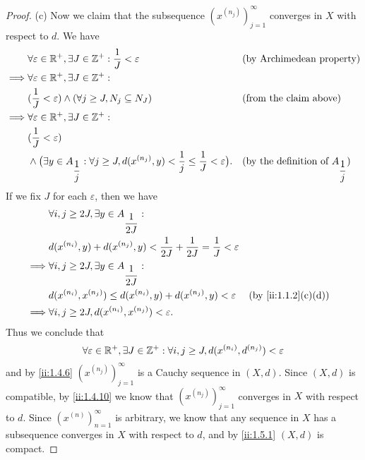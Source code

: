 \begin{proof}{(c)}
  Now we claim that the subsequence \((x^{(n_j)})_{j = 1}^\infty\) converges in \(X\) with respect to \(d\).
  We have
  \begin{align*}
             & \forall \varepsilon \in \mathbb{R}^+, \exists J \in \mathbb{Z}^+ : \dfrac{1}{J} < \varepsilon                                                      &  & \text{(by Archimedean property)}                   \\
    \implies & \forall \varepsilon \in \mathbb{R}^+, \exists J \in \mathbb{Z}^+ :                                                                                                                                         \\
             & (\dfrac{1}{J} < \varepsilon) \land (\forall j \geq J, N_j \subseteq N_J)                                                           &  & \text{(from the claim above)}                      \\
    \implies & \forall \varepsilon \in \mathbb{R}^+, \exists J \in \mathbb{Z}^+ :                                                                                                                                         \\
             & (\dfrac{1}{J} < \varepsilon)                                                                                                                                                               \\
             & \land \big(\exists y \in A_{\dfrac{1}{j}} : \forall j \geq J, d(x^{(n_j)}, y) < \dfrac{1}{j} \leq \dfrac{1}{J} < \varepsilon\big). &  & \text{(by the definition of \(A_{\dfrac{1}{j}}\))}
  \end{align*}
  If we fix \(J\) for each \(\varepsilon\), then we have
  \begin{align*}
             & \forall i, j \geq 2J, \exists y \in A_{\dfrac{1}{2J}} :                                                             \\
             & d(x^{(n_i)}, y) + d(x^{(n_j)}, y) < \dfrac{1}{2J} + \dfrac{1}{2J} = \dfrac{1}{J} < \varepsilon                      \\
    \implies & \forall i, j \geq 2J, \exists y \in A_{\dfrac{1}{2J}} :                                                             \\
             & d(x^{(n_i)}, x^{(n_j)}) \leq d(x^{(n_i)}, y) + d(x^{(n_j)}, y) < \varepsilon                   &  & \by{ii:1.1.2}[c,d] \\
    \implies & \forall i, j \geq 2J, d(x^{(n_i)}, x^{(n_j)}) < \varepsilon.
  \end{align*}
  Thus we conclude that
  \[
    \forall \varepsilon \in \mathbb{R}^+, \exists J \in \mathbb{Z}^+ : \forall i, j \geq J, d(x^{(n_i)}, d^{(n_j)}) < \varepsilon
  \]
  and by \cref{ii:1.4.6} \((x^{(n_j)})_{j = 1}^\infty\) is a Cauchy sequence in \((X, d)\).
  Since \((X, d)\) is compatible, by \cref{ii:1.4.10} we know that \((x^{(n_j)})_{j = 1}^\infty\) converges in \(X\) with respect to \(d\).
  Since \((x^{(n)})_{n = 1}^\infty\) is arbitrary, we know that any sequence in \(X\) has a subsequence converges in \(X\) with respect to \(d\), and by \cref{ii:1.5.1} \((X, d)\) is compact.
\end{proof}

